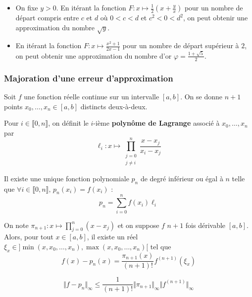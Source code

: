   \begin{example}
    \begin{itemize}
      \item On fixe $y > 0$. En itérant la fonction $F : x \mapsto \frac{1}{2} \left( x + \frac{y}{x} \right)$ pour un nombre de départ compris entre $c$ et $d$ où $0 < c < d$ et $c^2 < 0 < d^2$, on peut obtenir une approximation du nombre $\sqrt{y}$.
      \item En itérant la fonction $F : x \mapsto \frac{x^2+1}{2x-1}$ pour un nombre de départ supérieur à $2$, on peut obtenir une approximation du nombre d'or $\varphi = \frac{1+\sqrt{5}}{2}$.
    \end{itemize}
  \end{example}

  \subsubsection{Majoration d'une erreur d'approximation}


  Soit $f$ une fonction réelle continue sur un intervalle $[a,b]$. On se donne $n+1$ points $x_0, \dots, x_n \in [a,b]$ distincts deux-à-deux.

  \begin{definition}
    Pour $i \in \llbracket 0, n \rrbracket$, on définit le $i$-ième \textbf{polynôme de Lagrange} associé à $x_0, \dots, x_n$ par
    \[ \ell_i : x \mapsto \prod_{\substack{j=0\\j \neq i}}^n \frac{x-x_j}{x_i-x_j} \]
  \end{definition}

  \begin{theorem}
    Il existe une unique fonction polynomiale $p_n$ de degré inférieur ou égal à $n$ telle que $\forall i \in \llbracket 0, n \rrbracket, \, p_n(x_i) = f(x_i)$ :
    \[ p_n = \sum_{i=0}^n f(x_i) \ell_i \]
  \end{theorem}

  \begin{theorem}
    On note $\pi_{n+1} : x \mapsto \prod_{j=0}^{n} (x-x_j)$ et on suppose $f$ $n+1$ fois dérivable $[a,b]$. Alors, pour tout $x \in [a,b]$, il existe un réel $\xi_x \in ]\min(x,x_0,\dots,x_n),\max(x,x_0,\dots,x_n)[$ tel que
    \[ f(x)-p_n(x) = \frac{\pi_{n+1}(x)}{(n+1)!} f^{(n+1)}(\xi_x) \]
  \end{theorem}

  \begin{corollary}
    \[ \Vert f - p_n \Vert_\infty \leq \frac{1}{(n+1)!} \Vert \pi_{n+1} \Vert_\infty \Vert f^{(n+1)} \Vert_\infty \]
  \end{corollary}

